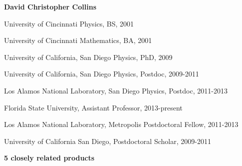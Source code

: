 \documentclass[11pt]{article}
\begin{document}
\noindent 
{\bf\large David Christopher Collins}

\medskip


\noindent
University of Cincinnati \hfill Physics, BS, 2001

\noindent
University of Cincinnati \hfill Mathematics, BA, 2001

\noindent
University of California, San Diego \hfill Physics, PhD, 2009

\noindent
University of California, San Diego \hfill Physics, Postdoc, 2009-2011


\noindent
Los Alamos National Laboratory, San Diego \hfill Physics, Postdoc, 2011-2013



\medskip


\noindent
Florida State University, Assistant Professor, \hfill 2013-present

\noindent
Los Alamos National Laboratory, Metropolis Postdoctoral Fellow, \hfill 2011-2013

\noindent
University of California San Diego, Postdoctoral Scholar, \hfill 2009-2011

\medskip


\vspace{-2mm}
\noindent
\textbf{5 closely related products}
\vspace{-4mm}
\end{document}
